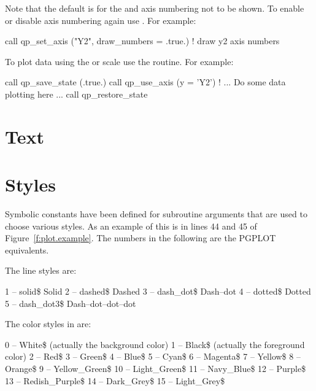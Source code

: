 Note that the default is for the  and  axis numbering
not to be shown. To enable or disable axis numbering again use
. For example:
\begin{example}
  call qp_set_axis ("Y2", draw_numbers = .true.)  ! draw y2 axis numbers
\end{example}

To plot data using the  or  scale use the
 routine. For example:
\begin{example}
  call qp_save_state (.true.)
  call qp_use_axis (y = 'Y2')
  ! ... Do some data plotting here ...
  call qp_restore_state
\end{example}

\section{Text}
\label{s:text}



\section{Styles}
\label{s:styles}

Symbolic constants have been defined for \quickplot subroutine
arguments that are used to choose various styles. As an example of
this is in lines 44 and 45 of Figure~\ref{f:plot.example}. The
numbers in the following are the PGPLOT equivalents.

The \quickplot line styles are:
\begin{example}
    1 -- solid\$                  Solid
    2 -- dashed\$                 Dashed
    3 -- dash_dot\$               Dash--dot 
    4 -- dotted\$                 Dotted
    5 -- dash_dot3\$              Dash--dot--dot--dot        
\end{example}

The color styles in \quickplot are:
\begin{example}
    0 -- White\$   (actually the background color)
    1 -- Black\$   (actually the foreground color)
    2 -- Red\$
    3 -- Green\$
    4 -- Blue\$
    5 -- Cyan\$
    6 -- Magenta\$
    7 -- Yellow\$ 
    8 -- Orange\$
    9 -- Yellow_Green\$
   10 -- Light_Green\$
   11 -- Navy_Blue\$
   12 -- Purple\$
   13 -- Redish_Purple\$
   14 -- Dark_Grey\$
   15 -- Light_Grey\$
\end{example}

